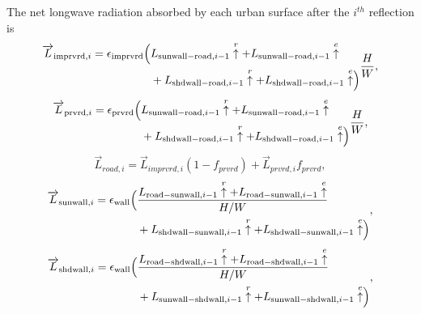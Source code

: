\documentclass[12pt,authoryear]{elsarticle}
\numberwithin{equation}{section} %
\begin{document}
The net longwave radiation absorbed by each urban surface after the $i^{th}$ reflection is
\begin{equation}
\label{eq:net_longwave_radiation_absorbed_imprvrd}
\begin{aligned}
\overrightarrow{L}_{\mathrm{imprvrd},i}
= \epsilon_{\mathrm{imprvrd}}
\Bigl(
&L_{\mathrm{sunwall-road},i-1}\overset{r}{\uparrow}
+ L_{\mathrm{sunwall-road},i-1}\overset{e}{\uparrow} \\
&+ L_{\mathrm{shdwall-road},i-1}\overset{r}{\uparrow}
+ L_{\mathrm{shdwall-road},i-1}\overset{e}{\uparrow}
\Bigr)
\end{aligned}\frac{H}{W},
\end{equation}
\begin{equation}
\begin{aligned}
\overrightarrow{L}_{\mathrm{prvrd},i}
= \epsilon_{\mathrm{prvrd}}
\Bigl(
&L_{\mathrm{sunwall-road},i-1}\overset{r}{\uparrow}
+ L_{\mathrm{sunwall-road},i-1}\overset{e}{\uparrow} \\
&+ L_{\mathrm{shdwall-road},i-1}\overset{r}{\uparrow}
+ L_{\mathrm{shdwall-road},i-1}\overset{e}{\uparrow}
\Bigr)
\end{aligned}\frac{H}{W},
\end{equation}
\begin{equation}
\overrightarrow{L}_{road,i}=\overrightarrow{L}_{imprvrd,i}(1-f_{prvrd})+\overrightarrow{L}_{prvrd,i}f_{prvrd},
\end{equation}
\begin{equation}
\begin{aligned}
\overrightarrow{L}_{\mathrm{sunwall},i}
= \epsilon_{\mathrm{wall}}
\Bigl(
&\frac{L_{\mathrm{road-sunwall},i-1}\overset{r}{\uparrow}
+ L_{\mathrm{road-sunwall},i-1}\overset{e}{\uparrow}}{H/W} \\
&+ L_{\mathrm{shdwall-sunwall},i-1}\overset{r}{\uparrow}
+ L_{\mathrm{shdwall-sunwall},i-1}\overset{e}{\uparrow}
\Bigr)
\end{aligned},
\end{equation}
\begin{equation}
\begin{aligned}
\overrightarrow{L}_{\mathrm{shdwall},i}
= \epsilon_{\mathrm{wall}}
\Bigl(
&\frac{L_{\mathrm{road-shdwall},i-1}\overset{r}{\uparrow}
+ L_{\mathrm{road-shdwall},i-1}\overset{e}{\uparrow}}{H/W} \\
&+ L_{\mathrm{sunwall-shdwall},i-1}\overset{r}{\uparrow}
+ L_{\mathrm{sunwall-shdwall},i-1}\overset{e}{\uparrow}
\Bigr)
\end{aligned},
\end{equation}
\end{document}
